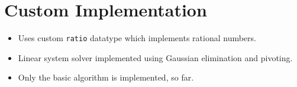 \documentclass[english,version-2020-11]{uzl-thesis}
\begin{document}
\section{Custom Implementation}

\begin{itemize}
  \item Uses custom \texttt{ratio} datatype which implements rational numbers.
  \item Linear system solver implemented using Gaussian elimination and pivoting.
  \item Only the basic algorithm is implemented, so far.
\end{itemize}

\begin{bibtex-entries}
\end{bibtex-entries}
\end{document}
